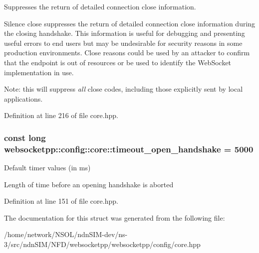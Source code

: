 Suppresses the return of detailed connection close information. 

Silence close suppresses the return of detailed connection close information during the closing handshake. This information is useful for debugging and presenting useful errors to end users but may be undesirable for security reasons in some production environments. Close reasons could be used by an attacker to confirm that the endpoint is out of resources or be used to identify the Web\+Socket implementation in use.

Note\+: this will suppress {\itshape all} close codes, including those explicitly sent by local applications. 

Definition at line 216 of file core.\+hpp.

\subsubsection[{\texorpdfstring{timeout\+\_\+open\+\_\+handshake}{timeout\_open\_handshake}}]{\setlength{\rightskip}{0pt plus 5cm}const long websocketpp\+::config\+::core\+::timeout\+\_\+open\+\_\+handshake = 5000\hspace{0.3cm}{\ttfamily [static]}}\hypertarget{structwebsocketpp_1_1config_1_1core_a48b8736d5603bf1b629c1aff75939515}{}\label{structwebsocketpp_1_1config_1_1core_a48b8736d5603bf1b629c1aff75939515}


Default timer values (in ms) 

Length of time before an opening handshake is aborted 

Definition at line 151 of file core.\+hpp.



The documentation for this struct was generated from the following file\+:\begin{DoxyCompactItemize}
\item 
/home/network/\+N\+S\+O\+L/ndn\+S\+I\+M-\/dev/ns-\/3/src/ndn\+S\+I\+M/\+N\+F\+D/websocketpp/websocketpp/config/core.\+hpp\end{DoxyCompactItemize}
